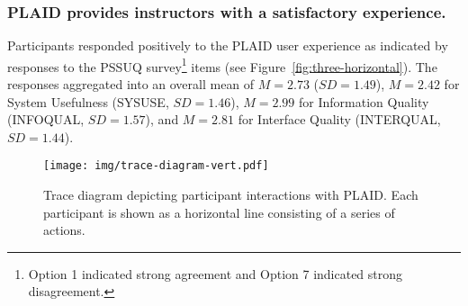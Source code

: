 \subsubsection{PLAID provides instructors with a satisfactory experience.}
Participants responded positively to the PLAID user experience as indicated by responses to the PSSUQ survey\footnote{Option 1 indicated strong agreement and Option 7 indicated strong disagreement.} items (see Figure~\ref{fig:three-horizontal}). The responses aggregated into an overall mean of $M = 2.73$ ($SD= 1.49$), $M = 2.42$ for System Usefulness (SYSUSE, $SD= 1.46$), $M = 2.99$ for Information Quality (INFOQUAL, $SD = 1.57$), and $M = 2.81$ for Interface Quality (INTERQUAL, $SD = 1.44$).




\begin{figure*}[t!]
    \centering
    \texttt{[image: img/trace-diagram-vert.pdf]}
    \caption{Trace diagram depicting participant interactions with PLAID. Each participant is shown as a horizontal line consisting of a series of actions.}
    \label{fig:trace-diagram}
\end{figure*}

